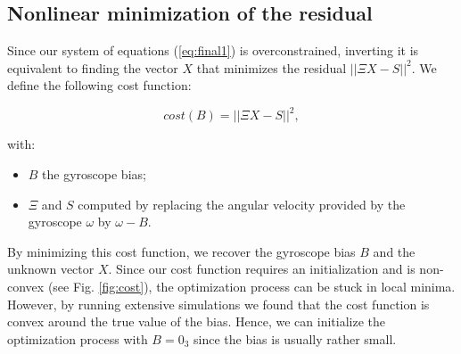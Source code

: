 \documentclass[letterpaper, 10 pt, journal, twoside]{IEEEtran}  %
\begin{document}
%


\subsection{Nonlinear minimization of the residual}

Since our system of equations (\ref{eq:final1}) is overconstrained,
inverting it is equivalent to finding the vector $X$ that minimizes the residual $||\Xi X - S||^2$.
We define the following cost function:

\begin{equation}
  \label{eq:cost}
  cost(B) = ||\Xi X - S||^2,
\end{equation}

\noindent with:
\begin{itemize}
\item $B$ the gyroscope bias;
\item $\Xi$ and $S$ computed by replacing the angular velocity provided by the gyroscope $\omega$ by $\omega - B$.
\end{itemize}

By minimizing this cost function, we recover the gyroscope bias $B$ and the unknown vector $X$.
Since our cost function requires an initialization and is non-convex (see Fig. \ref{fig:cost}),
the optimization process can be stuck in local minima.
However, by running extensive simulations we found that the cost function is convex around the true value of the bias. Hence, we can initialize the optimization process with $B = 0_3$ since the bias is usually rather small.
\end{document}
